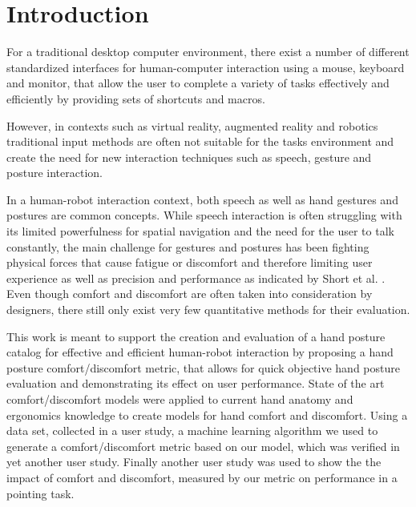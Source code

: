 \documentclass{sig-alternate-05-2015}
\begin{document}





%
%

%
%
\printccsdesc



\section{Introduction}

For a traditional desktop computer environment, there exist a number of different standardized interfaces for human-computer interaction using a mouse, keyboard and monitor, that allow the user to 
complete a variety of tasks effectively and efficiently by providing sets of shortcuts and macros. 

However, in contexts such as virtual reality, augmented reality and robotics traditional input methods are often not suitable for the tasks environment and create the need for new interaction techniques such as speech, gesture and posture interaction. 

In a human-robot interaction context, both speech as well as hand gestures and postures are common concepts. While speech interaction is often struggling with its limited powerfulness for spatial navigation and the need for the user to talk constantly, the main challenge for gestures and postures has been fighting physical forces that cause fatigue or discomfort and therefore limiting user experience as well as precision and performance as indicated by Short et al. \cite{short1999precision}. Even though comfort and discomfort are often taken into consideration by designers, there still only exist very few quantitative methods for their evaluation\cite{naddeo2015proposal}.

This work is meant to support the creation and evaluation of a hand posture catalog for effective and efficient human-robot interaction by proposing a hand posture comfort/discomfort metric, that allows for quick objective hand posture evaluation and demonstrating its effect on user performance. State of the art comfort/discomfort models were applied to current hand anatomy and ergonomics knowledge to create models for hand comfort and discomfort. Using a data set, collected in a user study, a machine learning algorithm we used to generate a comfort/discomfort metric based on our model, which was verified in yet another user study. Finally another user study was used to show the the impact of comfort and discomfort, measured by our metric on performance in a pointing task.
\end{document}
